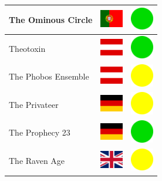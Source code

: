 \documentclass[12pt, a4paper, twoside]{report}
\begin{document}
\begin{center}
\begin{longtable}{|p{5cm}|p{2cm}|p{2cm}|}
 The Ominous Circle                                         & \includegraphics[width=1cm]{../4x3/pt} &   \includegraphics[width=1cm]{../likes/y} \\ \hline
 Theotoxin                                                  & \includegraphics[width=1cm]{../4x3/at} &   \includegraphics[width=1cm]{../likes/y} \\ \hline
 The Phobos Ensemble                                        & \includegraphics[width=1cm]{../4x3/at} &   \includegraphics[width=1cm]{../likes/m} \\ \hline
 The Privateer                                              & \includegraphics[width=1cm]{../4x3/de} &   \includegraphics[width=1cm]{../likes/m} \\ \hline
 The Prophecy 23                                            & \includegraphics[width=1cm]{../4x3/de} &   \includegraphics[width=1cm]{../likes/y} \\ \hline
 The Raven Age                                              & \includegraphics[width=1cm]{../4x3/gb} &   \includegraphics[width=1cm]{../likes/m} \\ \hline

\end{longtable}
\end{center}
\end{document}
